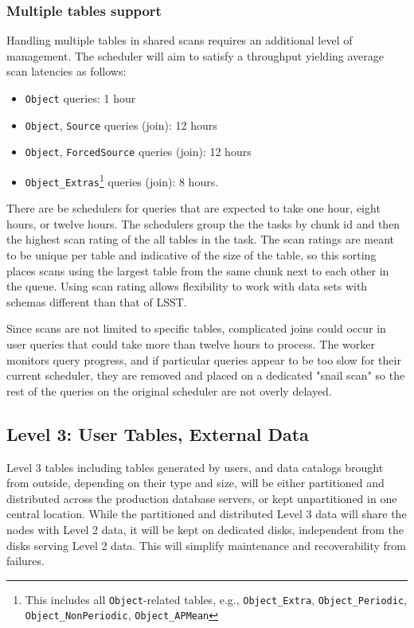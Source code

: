\documentclass[DM,lsstdraft,toc]{lsstdoc}
\begin{document}
\subsubsection{Multiple tables support}\label{shared-scan-multiple-tables-support}

Handling multiple tables in shared scans requires an additional level of
management. The scheduler will aim to satisfy a throughput yielding average
scan latencies as follows:

\begin{itemize}
\item
  \texttt{Object} queries: 1 hour
\item
  \texttt{Object}, \texttt{Source} queries (join): 12 hours
\item
  \texttt{Object}, \texttt{ForcedSource} queries (join): 12 hours
\item
  \texttt{Object\_Extras}\footnote{This includes all
    \texttt{Object}-related tables, e.g., \texttt{Object\_Extra},
    \texttt{Object\_Periodic}, \texttt{Object\_NonPeriodic},
    \texttt{Object\_APMean}} queries (join): 8 hours.
\end{itemize}

There are be schedulers for queries that are expected to take one hour, eight
hours, or twelve hours. The schedulers group the the tasks by chunk id and
then the highest scan rating of the all tables in the task. The scan ratings
are meant to be unique per table and indicative of the size of the table, so
this sorting places scans using the largest table from the same chunk next to
each other in the queue. Using scan rating allows flexibility to work with
data sets with schemas different than that of LSST.

Since scans are not limited to specific tables, complicated joins could
occur in user queries that could take more than twelve hours to process.
The worker monitors query progress, and if particular queries appear to be
too slow for their current scheduler, they are removed and placed on a
dedicated "snail scan" so the rest of the queries on the original scheduler
are not overly delayed.

\subsection{Level 3: User Tables, External Data}\label{level-3-user-tables-external-data}

Level 3 tables including tables generated by users, and data catalogs
brought from outside, depending on their type and size, will be either
partitioned and distributed across the production database servers, or
kept unpartitioned in one central location. While the partitioned and
distributed Level 3 data will share the nodes with Level 2 data, it will
be kept on dedicated disks, independent from the disks serving Level 2
data. This will simplify maintenance and recoverability from failures.
\end{document}
